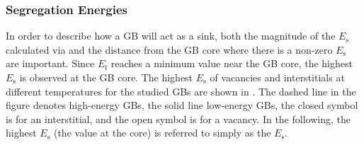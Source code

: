 \documentclass[review]{elsarticle}
\begin{document}
\subsubsection{Segregation Energies}
\par In order to describe how a GB will act as a sink, both the magnitude of the $E_{\mathrm{s}}$ calculated via  and the distance from the GB core where there is a non-zero $E_{\mathrm{s}}$ are important. Since $E_{\mathrm{f}}$ reaches a minimum value near the GB core, the highest $E_{\mathrm{s}}$ is observed at the GB core. The highest $E_{\mathrm{s}}$ of vacancies and interstitials at different temperatures for the studied GBs are shown in . The dashed line in the figure denotes high-energy GBs, the solid line low-energy GBs, the closed symbol is for an interstitial, and the open symbol is for a vacancy. In the following, the highest $E_{\mathrm{s}}$ (the value at the core) is referred to simply as the $E_{\mathrm{s}}$.
\end{document}
